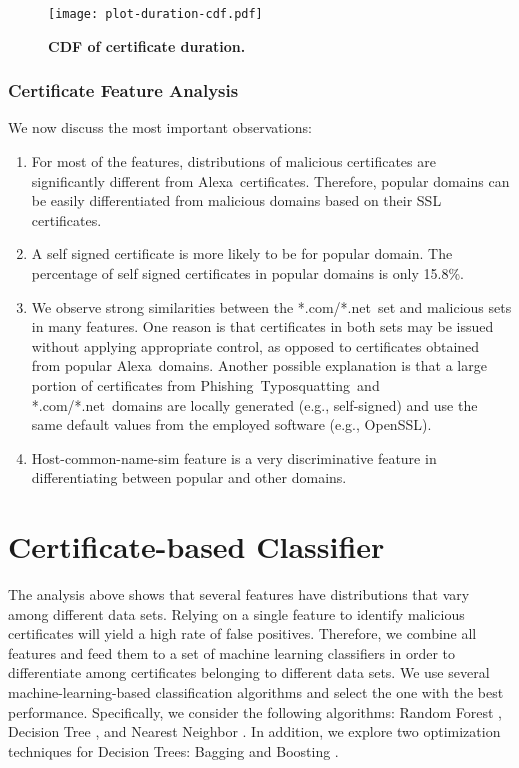 \documentclass[twocolumn]{article}
\newcommand{\Alexa}{\textsf{Alexa}}
\newcommand{\phishing}{\textsf{Phishing}}
\newcommand{\typosquatting}{\textsf{Typosquatting}}
\newcommand{\comnet}{\textsf{*.com/*.net}}
\begin{document}
\begin{figure}[t]
  \small
  \centering
\texttt{[image: plot-duration-cdf.pdf]}
   \vspace{-0.4cm}
   \caption{\label{fig:ccdf-cert-duration} {\small \bf CDF of certificate duration.}}
\end{figure}

\subsubsection{Certificate Feature Analysis}
We now discuss the most important observations:
\begin{enumerate}
\item For most of the features, distributions of malicious certificates are significantly different from \Alexa\ certificates. 
Therefore, popular domains can be easily differentiated from malicious domains based on their SSL certificates. 


\item A self signed certificate is more likely to be for popular domain. The percentage of self signed certificates in popular domains is only 15.8\%.

\item We observe strong similarities between the \comnet\ set and malicious sets in many features. One reason is that certificates in both sets 
may be issued without applying appropriate control, as opposed to certificates obtained from popular \Alexa\ domains. Another possible 
explanation is that a large portion of  certificates from \phishing\, \typosquatting\ and \comnet\ domains are locally generated 
(e.g., self-signed) and use the same default values
from the employed software (e.g., OpenSSL).

\item Host-common-name-sim feature is a very discriminative feature in differentiating between popular and other domains. 
  
\end{enumerate}

\section{Certificate-based Classifier}\label{sec:classifier}
The analysis above shows that several features have  
distributions that vary among different data sets. Relying on a single feature to identify malicious certificates will yield a high rate of false positives. 
Therefore, we combine all features and feed them to a set of machine learning classifiers in order to differentiate among certificates belonging to different data sets. We use several machine-learning-based classification algorithms and select the one with the best performance.
Specifically, we consider the following algorithms: Random Forest \cite{randforest}, Decision Tree \cite{dtree}, and  Nearest Neighbor \cite{mlearn1}. In addition, we explore two optimization techniques for
Decision Trees: Bagging \cite{bagging, boost-bag-c4.5} and Boosting \cite{boosting, boost-bag-c4.5}.
\end{document}
